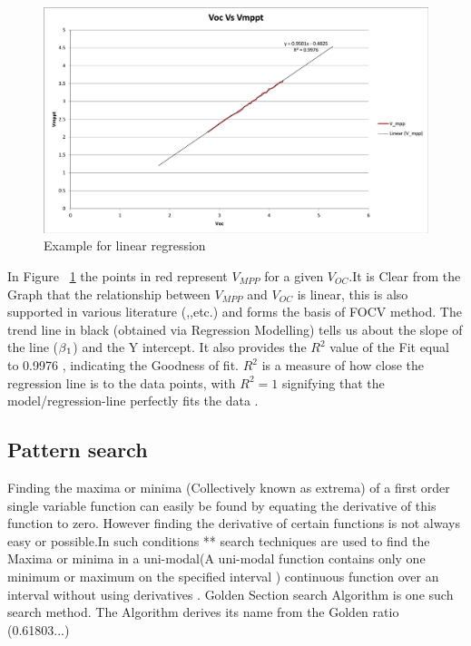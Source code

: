 {\begin{figure}[H]
  \begin{center}
  \includegraphics[width=\textwidth]{images/Reg_line}
  \caption{ Example for linear regression }
  \label{fig:linear_regression}
  \end{center}
  \end{figure}


In Figure ~\ref{fig:linear_regression} the points in red represent $V_{MPP}$ for a given $V_{OC}$.It is Clear from the Graph that the relationship between $V_{MPP}$ and $V_{OC}$ is linear, this is also supported in various literature (\cite{reza2013classification},\cite{esram2007comparison},etc.) and forms the basis of \ac{FOCV} method.  The trend line in black (obtained via Regression Modelling) tells us about the slope of the line ($\beta\textsubscript{1}$) and the Y intercept. It also provides the $R^{2}$ value of the Fit equal to 0.9976 , indicating the Goodness of fit. $R^{2}$ is a measure of how close the regression line is to the data points, with $R^{2} = 1 $ signifying that the model/regression-line perfectly fits the data \cite{Jim_R_squared}.


\subsection{Pattern search}


Finding the maxima or minima (Collectively known as extrema) of a first order single variable function can easily be found by equating the derivative of this function to zero. However finding the derivative of certain functions is not always easy or possible.In such conditions ** search techniques are used to find the Maxima or minima in a uni-modal(A uni-modal function contains only one minimum or maximum on the specified interval ) continuous function over an interval without using derivatives \cite{seiler1989numerical}.  Golden Section search Algorithm is one such search method. The Algorithm derives its name from the Golden ratio (0.61803...)\\

}
